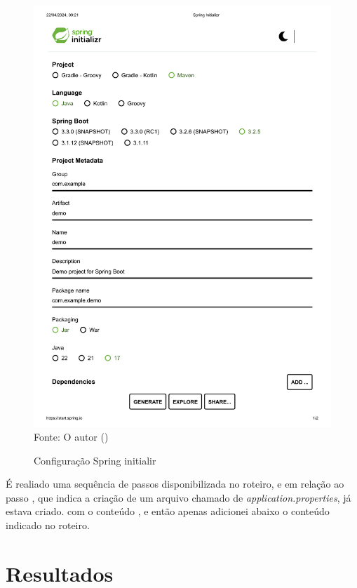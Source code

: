 \begin{figure}[H]
\center
  \caption{Configuração Spring initialir}
  \includegraphics[scale=0.6]{figure/Spring Initializr.pdf}
  \label{fig:spring}
  \flushleft %
    {\fontsize{10pt}{\baselineskip}\selectfont
    Fonte: O autor (\the\year) }
\end{figure}


\par É realiado uma sequência de passos disponibilizada no roteiro, e em relação ao passo , que indica a criação de um arquivo chamado de \textit{application.properties}, já estava criado. com o conteúdo , e então apenas adicionei abaixo o conteúdo indicado no roteiro.



\section{Resultados}



